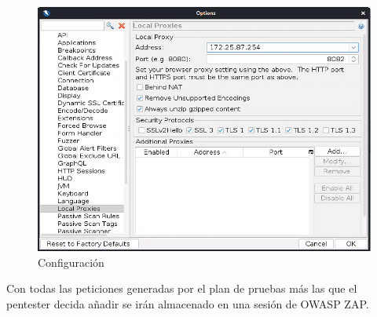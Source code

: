\begin{figure}[h!]
    \captionsetup{width=1\linewidth}  
    \includegraphics[width=\linewidth]{./imagenes/031_OWASPZAP_LocalProxy.png}
    \caption{Configuración}  
    \label{fig:localProxyOWASPZap}
\end{figure}

Con todas las peticiones generadas por el plan de pruebas más las que el pentester decida añadir se irán almacenado 
en una sesión de OWASP ZAP.

\newpage